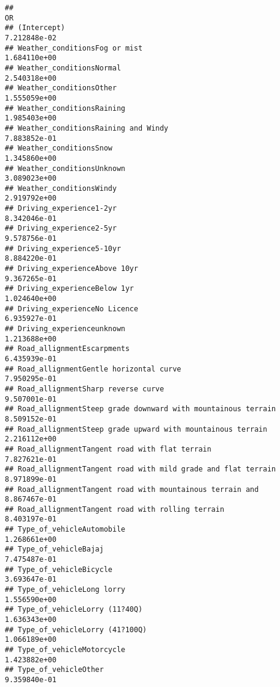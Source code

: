 \documentclass[
]{article}
\begin{document}
\begin{verbatim}
##                                                                        OR
## (Intercept)                                                  7.212848e-02
## Weather_conditionsFog or mist                                1.684110e+00
## Weather_conditionsNormal                                     2.540318e+00
## Weather_conditionsOther                                      1.555059e+00
## Weather_conditionsRaining                                    1.985403e+00
## Weather_conditionsRaining and Windy                          7.883852e-01
## Weather_conditionsSnow                                       1.345860e+00
## Weather_conditionsUnknown                                    3.089023e+00
## Weather_conditionsWindy                                      2.919792e+00
## Driving_experience1-2yr                                      8.342046e-01
## Driving_experience2-5yr                                      9.578756e-01
## Driving_experience5-10yr                                     8.884220e-01
## Driving_experienceAbove 10yr                                 9.367265e-01
## Driving_experienceBelow 1yr                                  1.024640e+00
## Driving_experienceNo Licence                                 6.935927e-01
## Driving_experienceunknown                                    1.213688e+00
## Road_allignmentEscarpments                                   6.435939e-01
## Road_allignmentGentle horizontal curve                       7.950295e-01
## Road_allignmentSharp reverse curve                           9.507001e-01
## Road_allignmentSteep grade downward with mountainous terrain 8.509152e-01
## Road_allignmentSteep grade upward with mountainous terrain   2.216112e+00
## Road_allignmentTangent road with flat terrain                7.827621e-01
## Road_allignmentTangent road with mild grade and flat terrain 8.971899e-01
## Road_allignmentTangent road with mountainous terrain and     8.867467e-01
## Road_allignmentTangent road with rolling terrain             8.403197e-01
## Type_of_vehicleAutomobile                                    1.268661e+00
## Type_of_vehicleBajaj                                         7.475487e-01
## Type_of_vehicleBicycle                                       3.693647e-01
## Type_of_vehicleLong lorry                                    1.556590e+00
## Type_of_vehicleLorry (11?40Q)                                1.636343e+00
## Type_of_vehicleLorry (41?100Q)                               1.066189e+00
## Type_of_vehicleMotorcycle                                    1.423882e+00
## Type_of_vehicleOther                                         9.359840e-01

\end{verbatim}
\end{document}
